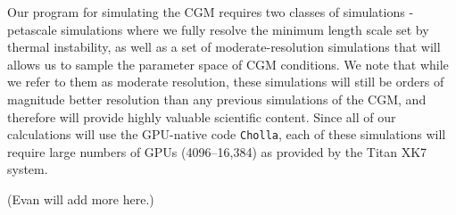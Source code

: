 \documentclass[11pt,letterpaper,english]{article}
\begin{document}



Our program for simulating the CGM requires two classes of simulations - petascale simulations where we fully resolve the minimum length scale set by thermal instability, as well as a set of moderate-resolution simulations that will allows us to sample the parameter space of CGM conditions. We note that while we refer to them as moderate resolution, these simulations will still be orders of magnitude better resolution than any previous simulations of the CGM, and therefore will provide highly valuable scientific content. Since all of
our calculations will use the GPU-native code {\tt Cholla}, each of these simulations will require large numbers of GPUs (4096--16,384) as provided by the Titan XK7 system.

(Evan will add more here.)


\end{document}
